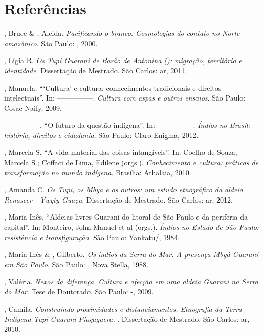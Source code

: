 {{\section{Referências}

\begin{Parskip}
, Bruce \& , Alcida. \emph{Pacificando o branco. Cosmologias do
contato no Norte amazônico}. São Paulo: , 2000.

, Lígia R. \emph{Os Tupi Guarani de Barão de Antonina (): migração,
território e identidade}. Dissertação de Mestrado. São Carlos: ar,
2011.

  , Manuela. ``‘Cultura’ e cultura: conhecimentos
tradicionais e direitos intelectuais''. In: —————. \emph{Cultura com aspas e outros
ensaios}. São Paulo: Cosac Naify, 2009. 

—————. ``O futuro da questão indígena''. In: —————. \emph{Índios no Brasil: história,
direitos e cidadania}. São Paulo: Claro Enigma, 2012.

  , Marcela S. ``A vida material das coisas intangíveis''.
In: Coelho de Souza, Marcela S.; Coffaci de Lima, Edilene (orgs.).
\emph{Conhecimento e cultura: práticas de transformação no mundo indígena}.
Brasília: Athalaia, 2010.

, Amanda C. \emph{Os Tupi, os Mbya e os outros: um estudo etnográfico da
aldeia Renascer - Ywyty Guaçu}. Dissertação de Mestrado. São Carlos:
ar, 2012. 

, Maria Inês. ``Aldeias livres Guarani do litoral de São Paulo e
da periferia da capital''. In: Monteiro, John Manuel et al (orgs.).
\emph{Índios no Estado de São Paulo: resistência e transfiguração}. São Paulo:
Yankatu/, 1984.

, Maria Inês \& , Gilberto. \emph{Os índios da Serra do Mar. A
presença Mbyá-Guarani em São Paulo}. São Paulo: , Nova Stella, 1988.

, Valéria. \emph{Nexos da diferença. Cultura e afecção em uma aldeia
Guarani na Serra do Mar}. Tese de Doutorado.  São Paulo: -,
2009.

, Camila. \emph{Construindo proximidades e distanciamentos. Etnografia
da Terra Indígena Tupi Guarani Piaçaguera, }. Dissertação de Mestrado.
São Carlos: ar, 2010.


\end{Parskip}}}
